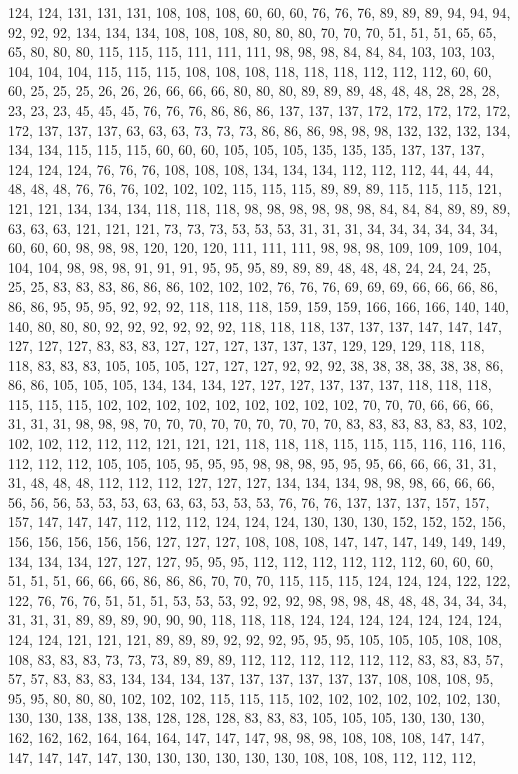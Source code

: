 124, 124, 131, 131, 131, 108, 108, 108, 60, 60, 60, 76, 76, 76, 89, 89, 89, 94, 94, 94, 92, 92, 92, 134, 134, 134, 108, 108, 108, 80, 80, 80, 70, 70, 70, 51, 51, 51, 65, 65, 65, 80, 80, 80, 115, 115, 115, 111, 111, 111, 98, 98, 98, 84, 84, 84, 103, 103, 103, 104, 104, 104, 115, 115, 115, 108, 108, 108, 118, 118, 118, 112, 112, 112, 60, 60, 60, 25, 25, 25, 26, 26, 26, 66, 66, 66, 80, 80, 80, 89, 89, 89, 48, 48, 48, 28, 28, 28, 23, 23, 23, 45, 45, 45, 76, 76, 76, 86, 86, 86, 137, 137, 137, 172, 172, 172, 172, 172, 172, 137, 137, 137, 63, 63, 63, 73, 73, 73, 86, 86, 86, 98, 98, 98, 132, 132, 132, 134, 134, 134, 115, 115, 115, 60, 60, 60, 105, 105, 105, 135, 135, 135, 137, 137, 137, 124, 124, 124, 76, 76, 76, 108, 108, 108, 134, 134, 134, 112, 112, 112, 44, 44, 44, 48, 48, 48, 76, 76, 76, 102, 102, 102, 115, 115, 115, 89, 89, 89, 115, 115, 115, 121, 121, 121, 134, 134, 134, 118, 118, 118, 98, 98, 98, 98, 98, 98, 84, 84, 84, 89, 89, 89, 63, 63, 63, 121, 121, 121, 73, 73, 73, 53, 53, 53, 31, 31, 31, 34, 34, 34, 34, 34, 34, 60, 60, 60, 98, 98, 98, 120, 120, 120, 111, 111, 111, 98, 98, 98, 109, 109, 109, 104, 104, 104, 98, 98, 98, 91, 91, 91, 95, 95, 95, 89, 89, 89, 48, 48, 48, 24, 24, 24, 25, 25, 25, 83, 83, 83, 86, 86, 86, 102, 102, 102, 76, 76, 76, 69, 69, 69, 66, 66, 66, 86, 86, 86, 95, 95, 95, 92, 92, 92, 118, 118, 118, 159, 159, 159, 166, 166, 166, 140, 140, 140, 80, 80, 80, 92, 92, 92, 92, 92, 92, 118, 118, 118, 137, 137, 137, 147, 147, 147, 127, 127, 127, 83, 83, 83, 127, 127, 127, 137, 137, 137, 129, 129, 129, 118, 118, 118, 83, 83, 83, 105, 105, 105, 127, 127, 127, 92, 92, 92, 38, 38, 38, 38, 38, 38, 86, 86, 86, 105, 105, 105, 134, 134, 134, 127, 127, 127, 137, 137, 137, 118, 118, 118, 115, 115, 115, 102, 102, 102, 102, 102, 102, 102, 102, 102, 70, 70, 70, 66, 66, 66, 31, 31, 31, 98, 98, 98, 70, 70, 70, 70, 70, 70, 70, 70, 70, 83, 83, 83, 83, 83, 83, 102, 102, 102, 112, 112, 112, 121, 121, 121, 118, 118, 118, 115, 115, 115, 116, 116, 116, 112, 112, 112, 105, 105, 105, 95, 95, 95, 98, 98, 98, 95, 95, 95, 66, 66, 66, 31, 31, 31, 48, 48, 48, 112, 112, 112, 127, 127, 127, 134, 134, 134, 98, 98, 98, 66, 66, 66, 56, 56, 56, 53, 53, 53, 63, 63, 63, 53, 53, 53, 76, 76, 76, 137, 137, 137, 157, 157, 157, 147, 147, 147, 112, 112, 112, 124, 124, 124, 130, 130, 130, 152, 152, 152, 156, 156, 156, 156, 156, 156, 127, 127, 127, 108, 108, 108, 147, 147, 147, 149, 149, 149, 134, 134, 134, 127, 127, 127, 95, 95, 95, 112, 112, 112, 112, 112, 112, 60, 60, 60, 51, 51, 51, 66, 66, 66, 86, 86, 86, 70, 70, 70, 115, 115, 115, 124, 124, 124, 122, 122, 122, 76, 76, 76, 51, 51, 51, 53, 53, 53, 92, 92, 92, 98, 98, 98, 48, 48, 48, 34, 34, 34, 31, 31, 31, 89, 89, 89, 90, 90, 90, 118, 118, 118, 124, 124, 124, 124, 124, 124, 124, 124, 124, 121, 121, 121, 89, 89, 89, 92, 92, 92, 95, 95, 95, 105, 105, 105, 108, 108, 108, 83, 83, 83, 73, 73, 73, 89, 89, 89, 112, 112, 112, 112, 112, 112, 83, 83, 83, 57, 57, 57, 83, 83, 83, 134, 134, 134, 137, 137, 137, 137, 137, 137, 108, 108, 108, 95, 95, 95, 80, 80, 80, 102, 102, 102, 115, 115, 115, 102, 102, 102, 102, 102, 102, 130, 130, 130, 138, 138, 138, 128, 128, 128, 83, 83, 83, 105, 105, 105, 130, 130, 130, 162, 162, 162, 164, 164, 164, 147, 147, 147, 98, 98, 98, 108, 108, 108, 147, 147, 147, 147, 147, 147, 130, 130, 130, 130, 130, 130, 108, 108, 108, 112, 112, 112, 